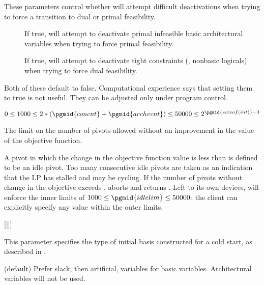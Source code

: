 \begin{codedoc}
  \item{}

  These parameters control whether \dylp will attempt difficult deactivations
  when trying to force a transition to dual or primal feasibility.
  \begin{description}
    \item[]
    If true, \dylp will attempt to deactivate primal infeasible basic
    architectural variables when trying to force primal feasibility.

    \item[]
    If true, \dylp will attempt to deactivate tight constraints (\ie, nonbasic
    logicals) when trying to force dual feasibility.
  \end{description}
  Both of these default to false.
  Computational experience says that setting them to true is not useful.
  They can be adjusted only under program control.

  \item{}
    \kw{;}

  $0 \leq 1000 \leq 2*(\pgmid{concnt}+\pgmid{archvcnt}) \le 50000
    \leq 2^{\pgmid{sizeof(int)}-3}$

  The limit on the number of pivots allowed without an improvement in the
  value of the objective function.

  A pivot in which the change in the objective function value is less than
   is defined to be an idle pivot.
  Too many consecutive idle pivots are taken as an indication that the
  LP has stalled and may be cycling.
  If the number of pivots without change in the
  objective exceeds , \dylp aborts and returns
  .
  Left to its own devices, \dylp will enforce the inner limits of
  $1000 \leq \pgmid{idlelim} \leq 50000$; the client can explicitly specify
  any value within the outer limits.

  \item{}
      [||] \kw{;}

  This parameter specifies the type of initial basis constructed for a cold
  start, as described in .
  \begin{description}[2 (\kw{architectural})]
    \item[1 (\kw{logical})]
    (default) Prefer slack, then artificial, variables for basic variables.
    Architectural variables will not be used.


\end{description}
\end{codedoc}
